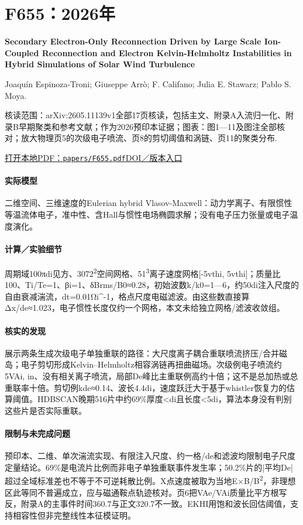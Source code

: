 \section{F655：2026年}\label{paper:F655}

\textbf{Secondary Electron-Only Reconnection Driven by Large Scale Ion-Coupled Reconnection and Electron Kelvin-Helmholtz Instabilities in Hybrid Simulations of Solar Wind Turbulence}\citep{F655}\

Joaquín Espinoza-Troni;  Giuseppe Arrò;  F. Califano;  Julia E. Stawarz;  Pablo S. Moya.

\textsf{核读范围：}arXiv:2605.11139v1全部17页核读，包括主文、附录A入流归一化、附录B早期聚类和参考文献；作为2026预印本证据；\textsf{图表：}图1—11及图注全部核对；放大物理页5的次级电子喷流、页8的剪切阈值和涡链、页11的聚类分布.

\href{run:papers/F655.pdf}{打开本地PDF：\texttt{papers/F655.pdf}}\quad\href{https://doi.org/10.48550/arxiv.2605.11139}{DOI／版本入口}

\paragraph{实际模型}二维空间、三维速度的Eulerian hybrid Vlasov-Maxwell：动力学离子、有限惯性等温流体电子，准中性、含Hall与惯性电场椭圆求解；没有电子压力张量或电子温度演化。

\paragraph{计算／实验细节}周期域100πdi见方、3072\textsuperscript{2}空间网格、51\textsuperscript{3}离子速度网格[-5vthi, 5vthi]；质量比100、Ti/Te=1、βi=1、δBrms/B0≈0.28，初始波数k/k0=1—6，约50di注入尺度的自由衰减湍流，dt=0.01Ωi\textasciicircum{}-1，格点尺度电磁滤波。由这些数直接算Δx/de≈1.023，电子惯性长度仅约一个网格，本文未给独立网格/滤波收敛组。

\paragraph{核实的发现}展示两条生成次级电子单独重联的路径：大尺度离子耦合重联喷流挤压/合并磁岛；电子剪切形成Kelvin–Helmholtz相容涡链再扭曲磁场。次级例电子喷流约5VAi, in、没有相关离子喷流，局部De峰比主重联例高约十倍；这不是总加热或总重联率十倍。剪切例kde≈0.14、波长4.4di，速度跃迁大于基于whistler恢复力的估算阈值。HDBSCAN晚期516片中约69\%厚度<di且长度<5di，算法本身没有判别这些片是否实际重联。

\paragraph{限制与未完成问题}预印本、二维、单次湍流实现、有限注入尺度、约一格/de和滤波均限制电子尺度定量结论。69\%是电流片比例而非电子单独重联事件发生率；50.2\%片的|平均De|超过全域标准差也不等于不可逆耗散比例。X点速度被取为当地E×B/B\textsuperscript{2}，非理想区此等同不普遍成立，应与磁通鞍点轨迹核对。页6把VAe/VAi质量比平方根写反，附录A的主事件时间360.7与正文320.7不一致。EKHI用饱和波长回估阈值，支持相容性但非完整线性本征模证明。

